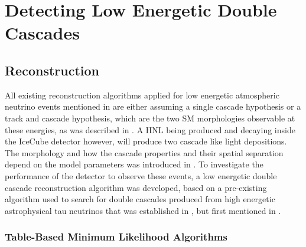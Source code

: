 \setchapterpreamble[u]{\margintoc}

\chapter{Detecting Low Energetic Double Cascades}


\section{Reconstruction}

All existing reconstruction algorithms applied for low energetic atmospheric neutrino events mentioned in  are either assuming a single cascade hypothesis or a track and cascade hypothesis, which are the two SM morphologies observable at these energies, as was described in . A HNL being produced and decaying inside the IceCube detector however, will produce two cascade like light depositions. The morphology and how the cascade properties and their spatial separation depend on the model parameters was introduced in . To investigate the performance of the detector to observe these events, a low energetic double cascade reconstruction algorithm was developed, based on a pre-existing algorithm used to search for double cascades produced from high energetic astrophysical tau neutrinos  that was established in , but first mentioned in .


\subsection{Table-Based Minimum Likelihood Algorithms}

